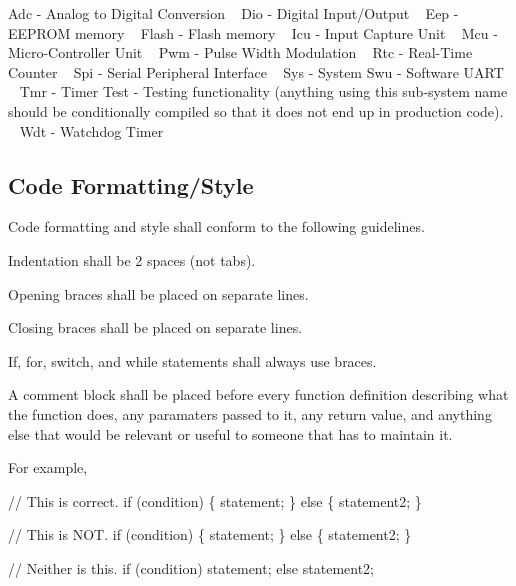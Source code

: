 Adc -\/ Analog to Digital Conversion ~\newline
 Dio -\/ Digital Input/\+Output ~\newline
 Eep -\/ E\+E\+P\+R\+O\+M memory ~\newline
 Flash -\/ Flash memory ~\newline
 Icu -\/ Input Capture Unit ~\newline
 Mcu -\/ Micro-\/\+Controller Unit ~\newline
 Pwm -\/ Pulse Width Modulation ~\newline
 Rtc -\/ Real-\/\+Time Counter ~\newline
 Spi -\/ Serial Peripheral Interface ~\newline
 Sys -\/ System Swu -\/ Software U\+A\+R\+T ~\newline
 Tmr -\/ Timer Test -\/ Testing functionality (anything using this sub-\/system name should be conditionally compiled so that it does not end up in production code). ~\newline
 Wdt -\/ Watchdog Timer ~\newline
\hypertarget{index_CF}{}\subsection{Code Formatting/\+Style}\label{index_CF}
Code formatting and style shall conform to the following guidelines.


\begin{DoxyItemize}
\item Indentation shall be 2 spaces (not tabs).
\item Opening braces shall be placed on separate lines.
\item Closing braces shall be placed on separate lines.
\item If, for, switch, and while statements shall always use braces.
\item A comment block shall be placed before every function definition describing what the function does, any paramaters passed to it, any return value, and anything else that would be relevant or useful to someone that has to maintain it.
\end{DoxyItemize}

For example, ~\newline
 
\begin{DoxyCode}
\textcolor{comment}{// This is correct. }
\textcolor{keywordflow}{if} (condition) 
\{ 
  statement; 
\} 
\textcolor{keywordflow}{else} 
\{ 
  statement2; 
\} 

\textcolor{comment}{// This is NOT.}
\textcolor{keywordflow}{if} (condition) \{ 
  statement;     
\} \textcolor{keywordflow}{else} \{        
  statement2;       
\}               

\textcolor{comment}{// Neither is this.}
\textcolor{keywordflow}{if} (condition) 
  statement; 
\textcolor{keywordflow}{else}        
  statement2; 
\end{DoxyCode}


